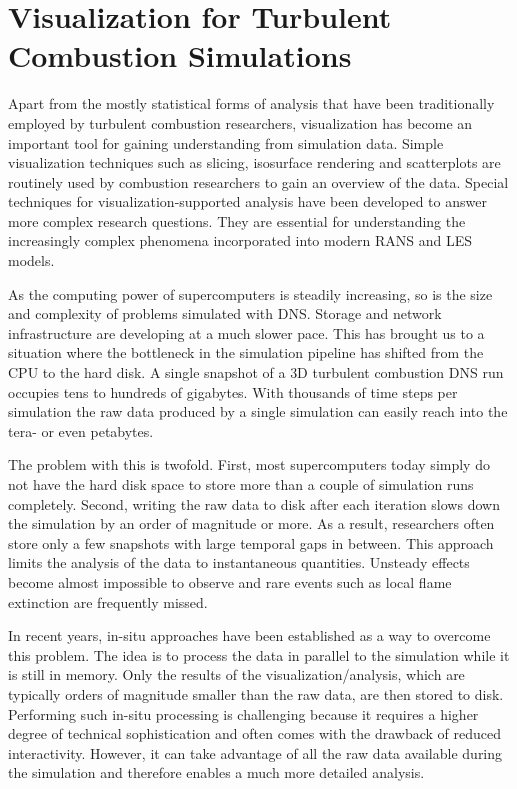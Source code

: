 \section{Visualization for Turbulent Combustion Simulations} %
\label{sec:visualization_for_turbulent_combustion_simulations}
%
Apart from the mostly statistical forms of analysis that have been traditionally
employed by turbulent combustion researchers, visualization has become an
important tool for gaining understanding from simulation data.
%
Simple visualization techniques such as slicing, isosurface rendering and
scatterplots are routinely used by combustion researchers to gain an overview of
the data.
%
Special techniques for visualization-supported analysis have been developed to
answer more complex research questions.
%
They are essential for understanding the increasingly complex phenomena
incorporated into modern \ac{RANS} and \ac{LES} models.
%

%
As the computing power of supercomputers is steadily increasing, so is the size
and complexity of problems simulated with \ac{DNS}.
%
Storage and network infrastructure are developing at a much slower pace.
%
This has brought us to a situation where the bottleneck in the simulation
pipeline has shifted from the \ac{CPU} to the hard disk.
%
A single snapshot of a \ac{3D} turbulent combustion \ac{DNS} run occupies tens
to hundreds of gigabytes.
%
With thousands of time steps per simulation the raw data produced by a single
simulation can easily reach into the tera- or even petabytes.
%

%
The problem with this is twofold.
%
First, most supercomputers today simply do not have the hard disk space to store
more than a couple of simulation runs completely.
%
Second, writing the raw data to disk after each iteration slows down the
simulation by an order of magnitude or more.
%
As a result, researchers often store only a few snapshots with large temporal
gaps in between.
%
This approach limits the analysis of the data to instantaneous quantities.
%
Unsteady effects become almost impossible to observe and rare events such as
local flame extinction are frequently missed.
%

%
In recent years, in-situ approaches have been established as a way to overcome
this problem.
%
The idea is to process the data in parallel to the simulation while it is still
in memory.
%
Only the results of the visualization/analysis, which are typically orders of
magnitude smaller than the raw data, are then stored to disk.
%
Performing such in-situ processing is challenging because it requires a higher
degree of technical sophistication and often comes with the drawback of reduced
interactivity.
%
However, it can take advantage of all the raw data available during the
simulation and therefore enables a much more detailed analysis.
%

